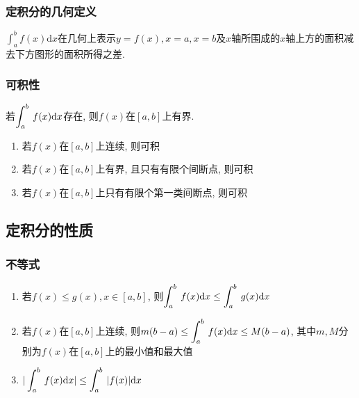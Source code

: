 \subsubsection{定积分的几何定义}
$ \displaystyle\int_{a}^{b}f(x)\mathrm{d}x $在几何上表示$ y=f(x), x=a, x=b $及$ x $轴所围成的$ x $轴上方的面积减去下方图形的面积所得之差.
\subsubsection{可积性}
\par \vspace{.5em}
若$ \displaystyle\int_{a}^{b}\hspace{.2em}f(x)\mathrm{d}x $存在, 则$ f(x) $在$ [a,b] $上有界.\par \vspace{.5em}
\begin{enumerate}
    \item 若$ f(x) $在$ [a,b] $上连续, 则可积
    \item 若$ f(x) $在$ [a,b] $上有界, 且只有有限个间断点, 则可积
    \item 若$ f(x) $在$ [a,b] $上只有有限个第一类间断点, 则可积
\end{enumerate}
\subsection{定积分的性质}
\subsubsection{不等式}
\begin{enumerate}
    \item 若$ f(x)\le g(x), x\in[a,b] $, 则$ \displaystyle\int_{a}^{b}\hspace{.2em}f(x)\mathrm{d}x\le \displaystyle\int_{a}^{b}\hspace{.2em}g(x)\mathrm{d}x $
    \item 若$ f(x) $在$ [a,b] $上连续, 则$ m(b-a)\le \displaystyle\int_{a}^{b}\hspace{.2em}f(x)\mathrm{d}x\le M(b-a) $, 其中$ m,M $分别为$ f(x) $在$ [a,b] $上的最小值和最大值
    \item $ |\displaystyle\int_{a}^{b}\hspace{.2em}f(x)\mathrm{d}x|\le \displaystyle\int_{a}^{b}\hspace{.2em}|f(x)|\mathrm{d}x $
\end{enumerate}

